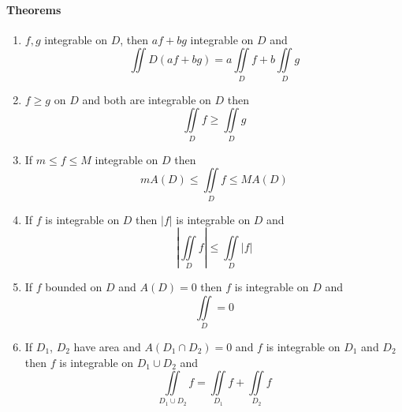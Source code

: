 \paragraph{Theorems}
\begin{enumerate}
	\item $f,g$ integrable on $D$, then $af+bg$ integrable on $D$ and
	$$\iint\limits{D} \left(af+bg\right) = a\iint\limits_{D} f + b\iint\limits_{D} g$$
	\item $f \geq g$ on $D$ and both are integrable on $D$ then 
	$$\iint\limits_{D} f \geq \iint\limits_{D} g$$
	\item If $m \leq f \leq M$ integrable on $D$ then
	$$mA(D) \leq \iint\limits_{D} f \leq MA(D)$$
	\item If $f$ is integrable on $D$ then $|f|$ is integrable on $D$ and
	$$\left|\iint\limits_{D} f\right| \leq \iint\limits_{D} |f|$$
	\item If $f$ bounded on $D$ and $A(D)=0$ then $f$ is integrable on $D$ and
	$$\iint\limits_{D} = 0$$
	\item If $D_1$, $D_2$ have area and $A(D_1 \cap D_2) = 0$ and $f$ is integrable on $D_1$ and $D_2$ then $f$ is integrable on $D_1 \cup D_2$ and
	$$\iint\limits_{D_1\cup D_2} f = \iint\limits_{D_1} f +\iint\limits_{D_2} f$$  
\end{enumerate}

